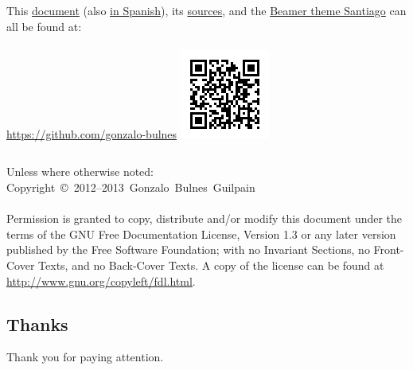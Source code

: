   \begin{frame}{\insertsubsection}

    \footnotesize
      \begin{columns}
          This \href{https://github.com/gonzalo-bulnes/free-software-to-develop-free-robotics/raw/master/FLOSH.pdf}{document} (also \href{https://github.com/gonzalo-bulnes/free-software-to-develop-free-robotics/raw/master/FLOSH-es.pdf}{in Spanish}), its \href{https://github.com/gonzalo-bulnes/free-software-to-develop-free-robotics}{sources}, and the \href{https://github.com/gonzalo-bulnes/santiago-beamer-theme}{Beamer theme Santiago} can all be found at:\\~\\
          \url{https://github.com/gonzalo-bulnes}
        \hfill\includegraphics[width=\textwidth]{images/sources-talk.png}
      \end{columns}
    \normalsize

    \scriptsize{Unless where otherwise noted:}\\
    \noindent\scriptsize{Copyright~\copyright~2012--2013~Gonzalo~Bulnes~Guilpain}\\~\\

    \scriptsize{Permission is granted to copy, distribute and/or modify this document
    under the terms of the GNU Free Documentation License, Version 1.3
    or any later version published by the Free Software Foundation;
    with no Invariant Sections, no Front-Cover Texts, and no Back-Cover Texts.
    A copy of the license can be found at \url{http://www.gnu.org/copyleft/fdl.html}.}
  \end{frame}

%
\subsection{Thanks}

  \begin{frame}
    \vspace{0mm}
    \begin{center}
      Thank you for paying attention.     
    \end{center}
  \end{frame}
